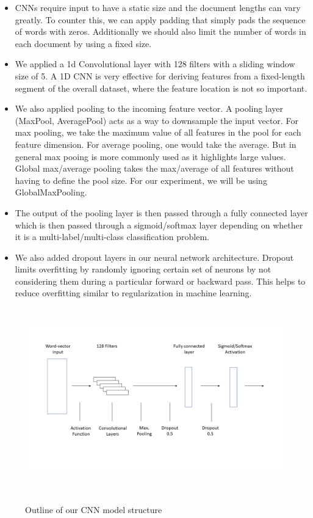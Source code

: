\begin{itemize}

\item{CNNs require input to have a static size and the document lengths can vary greatly. To counter this, we can apply padding that simply pads the sequence of words with zeros. Additionally we should also limit the number of words in each document by using a fixed size.}

\item{We applied a 1d Convolutional layer with 128 filters with a sliding window size of 5. A 1D CNN \cite{kiranyaz2015real} is very effective for deriving features from a fixed-length segment of the overall dataset, where the feature location is not so important.}

\item{We also applied pooling to the incoming feature vector. A pooling layer (MaxPool, AveragePool) acts as a way to downsample the input vector. For max pooling, we take the maximum value of all features in the pool for each feature dimension. For average pooling, one would take the average. But in general max pooing is more commonly used as it highlights large values. Global max/average pooling takes the max/average of all features without having to define the pool size. For our experiment, we will be using GlobalMaxPooling.}

\item{The output of the pooling layer is then passed through a fully connected layer which is then passed through a sigmoid/softmax layer depending on whether it is a multi-label/multi-class classification problem.}

\item{We also added dropout layers in our neural network architecture. Dropout \cite{srivastava2014dropout} limits overfitting by randomly ignoring certain set of neurons by not considering them during a particular forward or backward pass. This helps to reduce overfitting similar to regularization in machine learning.}

\end{itemize}

\begin{figure}[htbp]
\centering
\includegraphics[width=16cm, height=8cm]{images/cnn.png}\\
\centering
\caption{Outline of our CNN model structure}
\label{fig:foo}
\end{figure}


